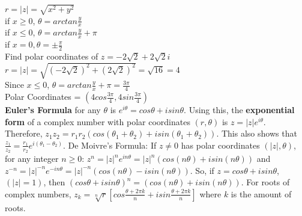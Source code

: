 \documentclass{article}
\begin{document}
            $r = \lvert z \rvert = \sqrt{x^2 + y^2}$ \\
            if $x \geq 0$, $\theta = arctan \frac{y}{x}$ \\
            if $x \leq 0$, $\theta = arctan \frac{y}{x} + \pi$ \\
            if $x = 0, \theta = \pm \frac{\pi}{2}$ \\ 
            Find polar coordinates of $z = -2\sqrt{2} + 2\sqrt{2}i$\\
            $r = \lvert z \rvert = \sqrt{(-2\sqrt{2})^2  + (2\sqrt{2})^2} = \sqrt{16} = 4$ \\
            Since $x \leq 0$, $\theta =  arctan \frac{y}{x} + \pi = \frac{3\pi}{4} $ \\
            Polar Coordinates = $(4cos\frac{3\pi}{4},4sin\frac{3\pi}{4})$ \\
            \textbf{Euler's Formula} for any $\theta$ is $e^{i\theta} = cos \theta + i sin \theta$. Using this, the \textbf{exponential form} of a complex number with polar coordinates $(r, \theta)$ is $z = \lvert z \rvert e^{i\theta}$. \\
            Therefore, $z_{1}z_{2}=r_{1}r_{2}(cos(\theta_{1}+\theta_{2})+isin(\theta_{1}+\theta_{2}))$. This also shows that $\frac{z_{1}}{z_{2}} = \frac{r_{1}}{r_{2}} e^{i(\theta_{1}-\theta_{2})}$.
            De Moivre's Formula: If $z \neq 0$ has polar coordinates $(\lvert z \rvert, \theta)$, for any integer $n \geq 0$: $z^n = \lvert z \rvert ^n e^{in\theta} = \lvert z \rvert ^n (cos (n\theta) + i sin (n\theta))$ and $z^{-n} = \lvert z \rvert ^{-n} e^{-in\theta} = \lvert z \rvert ^{-n} (cos (n\theta) - i sin(n\theta))$. So, if $z = cos \theta + i sin \theta$, $(\lvert z \rvert = 1)$, then $(cos \theta + i sin \theta)^n = (cos (n\theta) + i sin (n\theta))$. For roots of complex numbers, $z_{k} = \sqrt[n]{r} [cos \frac{\theta + 2\pi k}{n} + i sin \frac{\theta + 2 \pi k}{n}]$ where $k$ is the amount of roots. 
\end{document}
